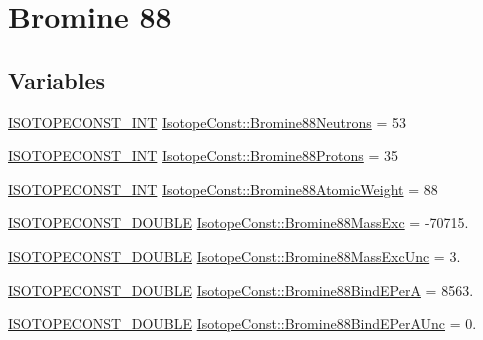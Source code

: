 \hypertarget{group___isotope_const-_bromine-_br88}{}\section{Bromine 88}
\label{group___isotope_const-_bromine-_br88}
\subsection*{Variables}
\begin{DoxyCompactItemize}
\item 
\mbox{\hyperlink{group___isotope_const-_macros_ga5f18360b3e99483a35c32d789e62621c}{I\+S\+O\+T\+O\+P\+E\+C\+O\+N\+S\+T\+\_\+\+I\+NT}} \mbox{\hyperlink{group___isotope_const-_bromine-_br88_gaefa51710c17174a633107b71e42689e0}{Isotope\+Const\+::\+Bromine88\+Neutrons}} = 53
\item 
\mbox{\hyperlink{group___isotope_const-_macros_ga5f18360b3e99483a35c32d789e62621c}{I\+S\+O\+T\+O\+P\+E\+C\+O\+N\+S\+T\+\_\+\+I\+NT}} \mbox{\hyperlink{group___isotope_const-_bromine-_br88_gad11b0c52cabb1e8f37e9e9464176d9df}{Isotope\+Const\+::\+Bromine88\+Protons}} = 35
\item 
\mbox{\hyperlink{group___isotope_const-_macros_ga5f18360b3e99483a35c32d789e62621c}{I\+S\+O\+T\+O\+P\+E\+C\+O\+N\+S\+T\+\_\+\+I\+NT}} \mbox{\hyperlink{group___isotope_const-_bromine-_br88_gad349144da916884628b3bab2d2c4f99b}{Isotope\+Const\+::\+Bromine88\+Atomic\+Weight}} = 88
\item 
\mbox{\hyperlink{group___isotope_const-_macros_ga8f45a7272ce02c0b4c65c44636ed719a}{I\+S\+O\+T\+O\+P\+E\+C\+O\+N\+S\+T\+\_\+\+D\+O\+U\+B\+LE}} \mbox{\hyperlink{group___isotope_const-_bromine-_br88_gaffd4bf054c3efdb2edd5a20b53fe96c6}{Isotope\+Const\+::\+Bromine88\+Mass\+Exc}} = -\/70715.
\item 
\mbox{\hyperlink{group___isotope_const-_macros_ga8f45a7272ce02c0b4c65c44636ed719a}{I\+S\+O\+T\+O\+P\+E\+C\+O\+N\+S\+T\+\_\+\+D\+O\+U\+B\+LE}} \mbox{\hyperlink{group___isotope_const-_bromine-_br88_ga649e8e12981f80a6caa34743b7ece7ac}{Isotope\+Const\+::\+Bromine88\+Mass\+Exc\+Unc}} = 3.
\item 
\mbox{\hyperlink{group___isotope_const-_macros_ga8f45a7272ce02c0b4c65c44636ed719a}{I\+S\+O\+T\+O\+P\+E\+C\+O\+N\+S\+T\+\_\+\+D\+O\+U\+B\+LE}} \mbox{\hyperlink{group___isotope_const-_bromine-_br88_ga9de28022ac26dd00830529109de8f1a8}{Isotope\+Const\+::\+Bromine88\+Bind\+E\+PerA}} = 8563.
\item 
\mbox{\hyperlink{group___isotope_const-_macros_ga8f45a7272ce02c0b4c65c44636ed719a}{I\+S\+O\+T\+O\+P\+E\+C\+O\+N\+S\+T\+\_\+\+D\+O\+U\+B\+LE}} \mbox{\hyperlink{group___isotope_const-_bromine-_br88_ga25dec3b2c5a13646e7fb8bc609bd5984}{Isotope\+Const\+::\+Bromine88\+Bind\+E\+Per\+A\+Unc}} = 0.

\end{DoxyCompactItemize}
